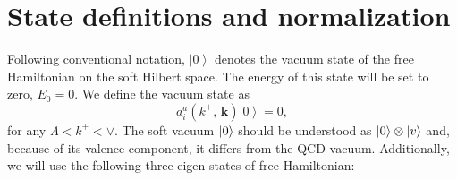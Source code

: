 \documentclass[a4paper,11pt]{article}
\begin{document}
\section{State definitions and normalization}\label{sec:app1}
Following conventional notation, $\left|0\right\rangle$ denotes the vacuum state of the free Hamiltonian on the soft Hilbert space.
The energy of this state will be set to zero, $E_{0}=0$. 
We define the vacuum state as 
\begin{equation}
 a_{i}^{a}(k^{+},\, \mathbf{k})\left|0\right\rangle =0,
\end{equation}
for any $\Lambda<k^{+}< \vee$. The soft vacuum $\ket{0}$  should be understood as $\ket{0}\otimes\ket{v}$  and, because of its valence component, it  differs from the QCD vacuum. Additionally, we will use the following three eigen states of free Hamiltonian:\\
\end{document}
